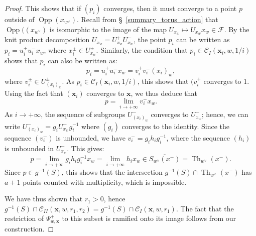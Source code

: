 \documentclass[12pt]{amsbook}%
\theoremstyle{definition}
\theoremstyle{remark}
\numberwithin{section}{chapter}
\numberwithin{subsection}{section}
\numberwithin{figure}{chapter}
\DeclareMathOperator{\Th}{Th}
\DeclareMathOperator{\Opp}{Opp}
\newcommand\bac[1]{{\color{blue} #1} }
\def\cF{{\mathscr{F}}}
\def\sK{{\mathscr{K}}}
\def\fuwp{{\mathfrak{u}_w^+}}
\def\Oppxwd{{\operatorname{Opp}(x_{w^\vee})}}
\def\Cyli{{\mathcal{C}_I}}
\def\Cylii{{\mathcal{C}_{II}}}
\def\bx{\mathbf{x}}
\begin{document}
{{\begin{proof}
This shows that if $(p_i)$ converges, then it must converge to a point $p$ outside of $\Opp(x_{w^\vee})$. 
Recall from \S~\ref{summary_torus_action} that $\Opp((x_{w^\vee})$ is isomorphic to the image of the map $ U_{x_w} \mapsto U_{x_w} x_w \in \cF $. 
By the knit product decomposition $U_{x_w} = U_{x_w}^+ U_{x_w}^-$, the point $p_i$ can be written as $p_i = u_i^+ u_i^- x_w$, 
where $x_i^{\pm} \in U_{x_w}^\pm$. Similarly, the condition that $p_i \in \mathcal{C}_{I}(\bx_i , w, 1/i)$ shows that $p_i$ can also be written as: 
\begin{equation*}
p_i = u_i^+ u_i^- x_w = v_i^+ v_i^- (x_{i})_w,
\end{equation*}
where $v_i^{\pm} \in U_{(x_i)_w}^{\pm}$. 
As $p_i \in \mathcal{C}_I(\bx_i , w , 1/i)$, this shows that $(v_i^+$ converges to $1$. Using the fact that $(\bx_i)$ converges to $\bx$, we thus deduce that 
\begin{equation*}
p = \lim_{i \rightarrow +\infty} v_i^- x_w.
\end{equation*}
As $i\rightarrow +\infty$, the sequence of subgroups $U_{(x_i)_w}^-$ converges to $U_{x_w}^-$; hence,  we can write 
$U_{(x_i)_w}^- = g_i U_{x_w}^- g_i^{-1}$ where $(g_i)$ converges to the identity. 
Since the sequence $(v_i^-)$ is unbounded, we have $v_i^-  = g_i h_i g_i^{-1}$, where the sequence $(h_i)$ 
is unbounded in $U_{x_w}^-$. This gives: 
\begin{equation}
p = \lim_{i\rightarrow +\infty} g_i h_i g_i^{-1} x_w = \lim_{i\rightarrow +\infty} h_i x_w  \in \overline{S_{w^\vee}(x^-)} = \Th_{w^\vee}(x^-).
\end{equation} 
Since $p \in g^{-1}(S)$, this shows that the intersection $g^{-1}(S) \cap \Th_{w^\vee}(x^-) $ has $a+1$ points counted with multiplicity, which is impossible. 

We have thus shown that $r_1 > 0$, hence $g^{-1}(S) \cap \mathcal{C}_{II}(\bx, w, r_1,r_2) = g^{-1}(S) \cap \mathcal{C}_{I}(\bx, w, r_1)$. 
The fact that the restriction of $\Psi_{w,\bx}^+$ to this subset is ramified onto its image follows from our construction. \end{proof}

%



}}
\end{document}
